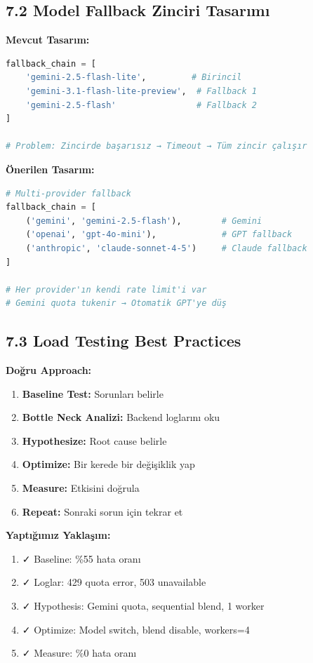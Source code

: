 \documentclass[12pt,a4paper]{report}
\begin{document}
\subsection{7.2 Model Fallback Zinciri Tasarımı}

\textbf{Mevcut Tasarım:}
\begin{lstlisting}[language=Python]
fallback_chain = [
    'gemini-2.5-flash-lite',         # Birincil
    'gemini-3.1-flash-lite-preview',  # Fallback 1
    'gemini-2.5-flash'                # Fallback 2
]

# Problem: Zincirde başarısız → Timeout → Tüm zincir çalışır
\end{lstlisting}

\textbf{Önerilen Tasarım:}
\begin{lstlisting}[language=Python]
# Multi-provider fallback
fallback_chain = [
    ('gemini', 'gemini-2.5-flash'),        # Gemini
    ('openai', 'gpt-4o-mini'),             # GPT fallback
    ('anthropic', 'claude-sonnet-4-5')     # Claude fallback
]

# Her provider'ın kendi rate limit'i var
# Gemini quota tukenir → Otomatik GPT'ye düş
\end{lstlisting}

\subsection{7.3 Load Testing Best Practices}

\textbf{Doğru Approach:}
\begin{enumerate}
    \item \textbf{Baseline Test:} Sorunları belirle
    \item \textbf{Bottle Neck Analizi:} Backend loglarını oku
    \item \textbf{Hypothesize:} Root cause belirle
    \item \textbf{Optimize:} Bir kerede bir değişiklik yap
    \item \textbf{Measure:} Etkisini doğrula
    \item \textbf{Repeat:} Sonraki sorun için tekrar et
\end{enumerate}

\textbf{Yaptığımız Yaklaşım:}
\begin{enumerate}
    \item ✓ Baseline: \%55 hata oranı
    \item ✓ Loglar: 429 quota error, 503 unavailable
    \item ✓ Hypothesis: Gemini quota, sequential blend, 1 worker
    \item ✓ Optimize: Model switch, blend disable, workers=4
    \item ✓ Measure: \%0 hata oranı
\end{enumerate}
\end{document}
